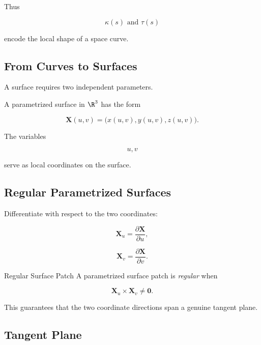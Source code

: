 Thus

\[
\boxed{
\kappa(s)
\text{ and }
\tau(s)
}
\]

encode the local shape of a space curve.

\subsection{From Curves to Surfaces}
\label{subsec:curves-to-surfaces}

A surface requires two independent parameters.

A parametrized surface in \(\R^3\) has the form

\[
\boxed{
\mathbf{X}(u,v)
=
\bigl(
x(u,v),
y(u,v),
z(u,v)
\bigr).
}
\]

The variables

\[
u,v
\]

serve as local coordinates on the surface.

\subsection{Regular Parametrized Surfaces}
\label{subsec:regular-parametrized-surfaces}

Differentiate with respect to the two coordinates:

\[
\mathbf{X}_u
=
\frac{\partial\mathbf{X}}{\partial u},
\]

\[
\mathbf{X}_v
=
\frac{\partial\mathbf{X}}{\partial v}.
\]

\begin{definitionbox}{Regular Surface Patch}
A parametrized surface patch is \emph{regular} when

\[
\boxed{
\mathbf{X}_u\times\mathbf{X}_v\neq\mathbf{0}.
}
\]
\end{definitionbox}

This guarantees that the two coordinate directions span a genuine tangent
plane.

\subsection{Tangent Plane}
\label{subsec:surface-tangent-plane}

